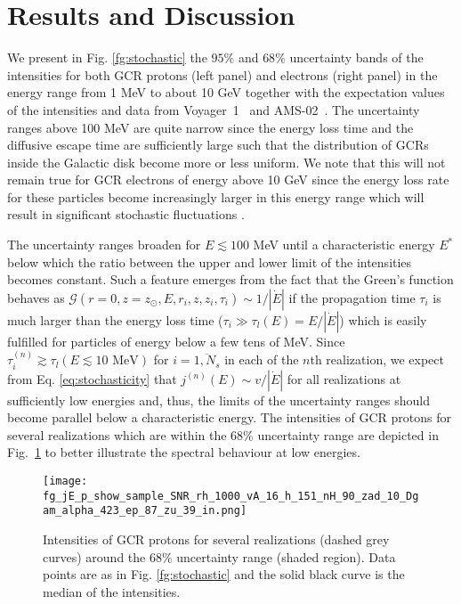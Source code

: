 \documentclass[%
reprint,
amsmath,amssymb,
aps,
superscriptaddress,
preprintnumbers
]{revtex4-2}
\begin{document}
\section{Results and Discussion}
\label{sec:results}

We present in Fig. \ref{fg:stochastic} the $95\%$ and $68\%$ uncertainty bands of the intensities for both GCR protons (left panel) and electrons (right panel) in the energy range from 1 MeV to about 10 GeV together with the expectation values of the intensities and data from Voyager~1~\citep{cummings2016} and AMS-02~\citep{AMS2014,AMS2015}. The uncertainty ranges above 100 MeV are quite narrow since the energy loss time and the diffusive escape time are sufficiently large such that the distribution of GCRs inside the Galactic disk become more or less uniform. We note that this will not remain true for GCR electrons of energy above 10 GeV since the energy loss rate for these particles become increasingly larger in this energy range which will result in significant stochastic fluctuations \citep{atoyan1995,ptuskin2006,mertsch2011,mertsch2018,recchia2019b,manconi2020,evoli2021}.

The uncertainty ranges broaden for $E\lesssim100$ MeV until a characteristic energy $E^*$ below which the ratio between the upper and lower limit of the intensities becomes constant. 
Such a feature emerges from the fact that the Green's function behaves as \mbox{$\mathcal{G}(r=0,z=z_\odot,E,r_i,z,z_i,\tau_i)\sim 1/|\dot{E}|$} if the propagation time $\tau_i$ is much larger than the energy loss time ($\tau_i\gg \tau_l(E)= E/|\dot{E}|$) which is easily fulfilled for particles of energy below a few tens of MeV. Since $\tau^{(n)}_i\gtrsim \tau_l(E\lesssim 10 \textrm{ MeV})$ for $i=\overline{1,N_{s}}$ in each of the $n$th realization, we expect from Eq. \ref{eq:stochasticity} that $j^{(n)}(E)\sim v/|\dot{E}|$ for all realizations at sufficiently low energies and, thus, the limits of the uncertainty ranges should become parallel below a characteristic energy. The intensities of GCR protons for several realizations which are within the 68\% uncertainty range are depicted in Fig.~\ref{fg:sample} to better illustrate the spectral behaviour at low energies. 

\begin{figure}[ht]
\texttt{[image: fg\_jE\_p\_show\_sample\_SNR\_rh\_1000\_vA\_16\_h\_151\_nH\_90\_zad\_10\_Dgam\_alpha\_423\_ep\_87\_zu\_39\_in.png]}
\caption{Intensities of GCR protons for several realizations (dashed grey curves) around the 68\% uncertainty range (shaded region). Data points are as in Fig. \ref{fg:stochastic} and the solid black curve is the median of the intensities.}
\label{fg:sample}
\end{figure}
\end{document}
